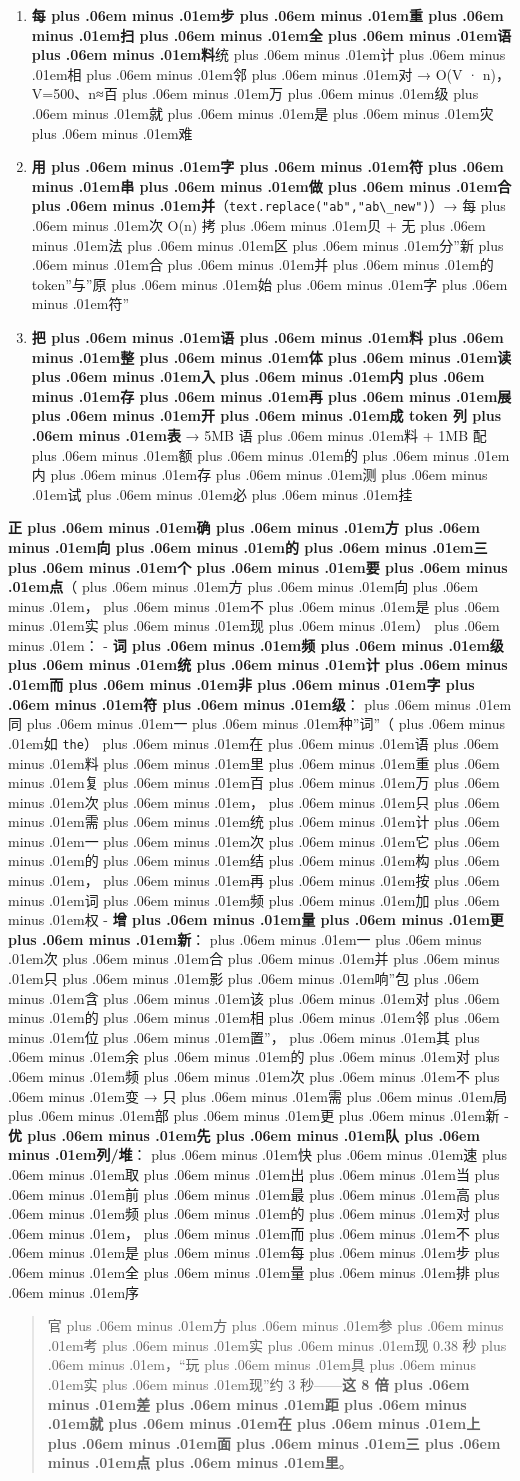 \documentclass[
]{article}
\newcommand{\passthrough}[1]{#1}
\providecommand{\tightlist}{%
  \setlength{\itemsep}{0pt}\setlength{\parskip}{0pt}}
\def\zh#1{{\zhfont #1}}
\def\sym#1{{\symfont #1}}
\def\zhglue{\hskip0pt plus .06em minus .01em}
\begin{document}
\begin{enumerate}
\def\labelenumi{\arabic{enumi}.}
\tightlist
\item
  \textbf{\zh{每\zhglue 步\zhglue 重\zhglue 扫\zhglue 全\zhglue 语\zhglue 料}}\zh{统\zhglue 计\zhglue 相\zhglue 邻\zhglue 对} \sym{→} O(V \sym{·} n)\zh{，}V=500\zh{、}n\sym{≈}\zh{百\zhglue 万\zhglue 级\zhglue 就\zhglue 是\zhglue 灾\zhglue 难}
\item
  \textbf{\zh{用\zhglue 字\zhglue 符\zhglue 串\zhglue 做\zhglue 合\zhglue 并}}\zh{（}\passthrough{\lstinline!text.replace("ab","ab\_new")!}\zh{）}\sym{→} \zh{每\zhglue 次} O(n) \zh{拷\zhglue 贝} + \zh{无\zhglue 法\zhglue 区\zhglue 分}''\zh{新\zhglue 合\zhglue 并\zhglue 的} token''\zh{与}''\zh{原\zhglue 始\zhglue 字\zhglue 符}''
\item
  \textbf{\zh{把\zhglue 语\zhglue 料\zhglue 整\zhglue 体\zhglue 读\zhglue 入\zhglue 内\zhglue 存\zhglue 再\zhglue 展\zhglue 开\zhglue 成} token \zh{列\zhglue 表}} \sym{→} 5MB \zh{语\zhglue 料} + 1MB \zh{配\zhglue 额\zhglue 的\zhglue 内\zhglue 存\zhglue 测\zhglue 试\zhglue 必\zhglue 挂}
\end{enumerate}

\textbf{\zh{正\zhglue 确\zhglue 方\zhglue 向\zhglue 的\zhglue 三\zhglue 个\zhglue 要\zhglue 点}}\zh{（\zhglue 方\zhglue 向\zhglue ，\zhglue 不\zhglue 是\zhglue 实\zhglue 现\zhglue ）\zhglue ：} - \textbf{\zh{词\zhglue 频\zhglue 级\zhglue 统\zhglue 计\zhglue 而\zhglue 非\zhglue 字\zhglue 符\zhglue 级}}\zh{：\zhglue 同\zhglue 一\zhglue 种}''\zh{词}''\zh{（\zhglue 如} \passthrough{\lstinline!the!}\zh{）\zhglue 在\zhglue 语\zhglue 料\zhglue 里\zhglue 重\zhglue 复\zhglue 百\zhglue 万\zhglue 次\zhglue ，\zhglue 只\zhglue 需\zhglue 统\zhglue 计\zhglue 一\zhglue 次\zhglue 它\zhglue 的\zhglue 结\zhglue 构\zhglue ，\zhglue 再\zhglue 按\zhglue 词\zhglue 频\zhglue 加\zhglue 权} - \textbf{\zh{增\zhglue 量\zhglue 更\zhglue 新}}\zh{：\zhglue 一\zhglue 次\zhglue 合\zhglue 并\zhglue 只\zhglue 影\zhglue 响}''\zh{包\zhglue 含\zhglue 该\zhglue 对\zhglue 的\zhglue 相\zhglue 邻\zhglue 位\zhglue 置}''\zh{，\zhglue 其\zhglue 余\zhglue 的\zhglue 对\zhglue 频\zhglue 次\zhglue 不\zhglue 变} \sym{→} \zh{只\zhglue 需\zhglue 局\zhglue 部\zhglue 更\zhglue 新} - \textbf{\zh{优\zhglue 先\zhglue 队\zhglue 列}/\zh{堆}}\zh{：\zhglue 快\zhglue 速\zhglue 取\zhglue 出\zhglue 当\zhglue 前\zhglue 最\zhglue 高\zhglue 频\zhglue 的\zhglue 对\zhglue ，\zhglue 而\zhglue 不\zhglue 是\zhglue 每\zhglue 步\zhglue 全\zhglue 量\zhglue 排\zhglue 序}

\begin{quote}
\zh{官\zhglue 方\zhglue 参\zhglue 考\zhglue 实\zhglue 现} 0.38 \zh{秒\zhglue ，}``\zh{玩\zhglue 具\zhglue 实\zhglue 现}''\zh{约} 3 \zh{秒}------\textbf{\zh{这} 8 \zh{倍\zhglue 差\zhglue 距\zhglue 就\zhglue 在\zhglue 上\zhglue 面\zhglue 三\zhglue 点\zhglue 里}}\zh{。}
\end{quote}
\end{document}
